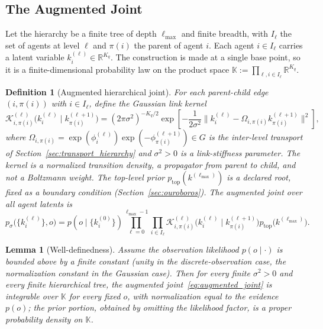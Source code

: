 \documentclass[11pt]{article}
\newtheorem{lemma}{Lemma}
\newtheorem{definition}{Definition}
\begin{document}
\subsection{The Augmented Joint}

Let the hierarchy be a finite tree of depth $\ell_{\max}$ and finite breadth, with $I_\ell$ the set of agents at level $\ell$ and $\pi(i)$ the parent of agent $i$. Each agent $i \in I_\ell$ carries a latent variable $k_i^{(\ell)} \in \mathbb{R}^{K_q}$. The construction is made at a single base point, so it is a finite-dimensional probability law on the product space $\mathbb{K} := \prod_{\ell, i \in I_\ell} \mathbb{R}^{K_q}$.

\begin{definition}[Augmented hierarchical joint]
\label{def:augmented_joint}
For each parent-child edge $(i, \pi(i))$ with $i \in I_\ell$, define the Gaussian link kernel
\begin{equation}
\mathcal{K}_{i,\pi(i)}^{(\ell)}\big(k_i^{(\ell)} \mid k_{\pi(i)}^{(\ell+1)}\big)
=
(2\pi\sigma^2)^{-K_q/2} \exp\left[-\frac{1}{2\sigma^2}
\big\|k_i^{(\ell)} - \Omega_{i,\pi(i)} k_{\pi(i)}^{(\ell+1)}\big\|^2\right],
\label{eq:gibbs_factor}
\end{equation}
where $\Omega_{i,\pi(i)} = \exp(\phi_i^{(\ell)})\exp(-\phi_{\pi(i)}^{(\ell+1)}) \in G$ is the inter-level transport of Section~\ref{sec:transport_hierarchy} and $\sigma^2 > 0$ is a link-stiffness parameter. The kernel is a normalized transition density, a propagator from parent to child, and not a Boltzmann weight. The top-level prior $p_{\mathrm{top}}(k^{(\ell_{\max})})$ is a declared root, fixed as a boundary condition (Section~\ref{sec:ouroboros}). The augmented joint over all agent latents is
\begin{equation}
p_{\sigma}\big(\{k_i^{(\ell)}\}, o\big)
=
p(o \mid \{k_i^{(0)}\}) \prod_{\ell = 0}^{\ell_{\max}-1} \prod_{i \in I_\ell} \mathcal{K}_{i,\pi(i)}^{(\ell)}\big(k_i^{(\ell)} \mid k_{\pi(i)}^{(\ell+1)}\big) p_{\mathrm{top}}\big(k^{(\ell_{\max})}\big).
\label{eq:augmented_joint}
\end{equation}
\end{definition}

\begin{lemma}[Well-definedness]
\label{lem:aug_joint_welldefined}
Assume the observation likelihood $p(o \mid \cdot)$ is bounded above by a finite constant (unity in the discrete-observation case, the normalization constant in the Gaussian case). Then for every finite $\sigma^2 > 0$ and every finite hierarchical tree, the augmented joint~\eqref{eq:augmented_joint} is integrable over $\mathbb{K}$ for every fixed $o$, with normalization equal to the evidence $p(o)$; the prior portion, obtained by omitting the likelihood factor, is a proper probability density on $\mathbb{K}$.
\end{lemma}
\end{document}

